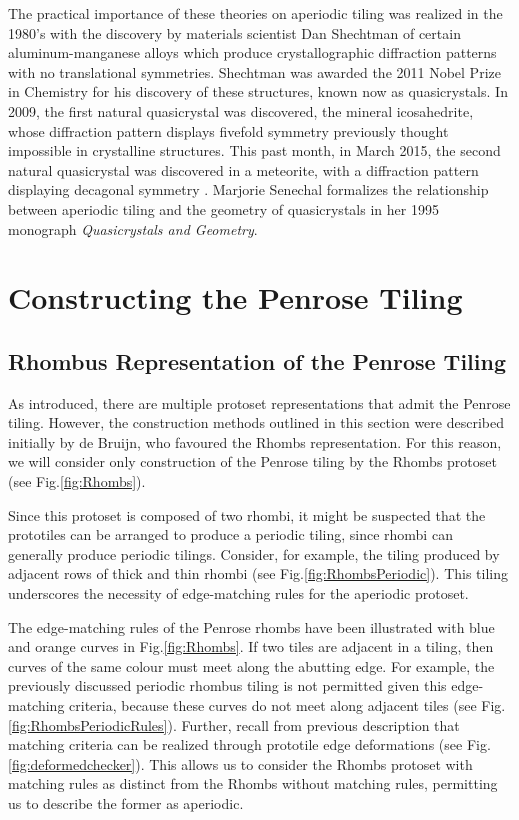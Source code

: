 \documentclass[
  oneside,
  11pt, a4paper,
  footinclude=true,
  headinclude=true,
  cleardoublepage=empty
]{scrbook}
\begin{document}
The practical importance of these theories on aperiodic tiling was realized in the 1980's with the discovery by materials scientist Dan Shechtman of certain aluminum-manganese alloys which produce crystallographic diffraction patterns with no translational symmetries. Shechtman was awarded the 2011 Nobel Prize in Chemistry for his discovery of these structures, known now as quasicrystals. In 2009, the first natural quasicrystal was discovered, the mineral icosahedrite, whose diffraction pattern displays fivefold symmetry previously thought impossible in crystalline structures. This past month, in March 2015, the second natural quasicrystal was discovered in a meteorite, with a diffraction pattern displaying decagonal symmetry \cite{Bindi2015}. Marjorie Senechal formalizes the relationship between aperiodic tiling and the geometry of quasicrystals in her 1995 monograph \textit{Quasicrystals and Geometry}. 


\chapter{Constructing the Penrose Tiling}

\section{Rhombus Representation of the Penrose Tiling} %
As introduced, there are multiple protoset representations that admit the Penrose tiling. However, the construction methods outlined in this section were described initially by de Bruijn, who favoured the Rhombs representation.  For this reason, we will consider only construction of the Penrose tiling by the Rhombs protoset (see Fig.\ref{fig:Rhombs}). 

Since this protoset is composed of two rhombi, it might be suspected that the prototiles can be arranged to produce a periodic tiling, since rhombi can generally produce periodic tilings. Consider, for example, the tiling produced by adjacent rows of thick and thin rhombi (see Fig.\ref{fig:RhombsPeriodic}). This tiling underscores the necessity of edge-matching rules for the aperiodic protoset. 

The edge-matching rules of the Penrose rhombs have been illustrated with blue and orange curves in Fig.\ref{fig:Rhombs}. If two tiles are adjacent in a tiling, then curves of the same colour must meet along the abutting edge. For example, the previously discussed periodic rhombus tiling is not permitted given this edge-matching criteria, because these curves do not meet along adjacent tiles (see Fig.\ref{fig:RhombsPeriodicRules}). Further, recall from previous description that matching criteria can be realized through prototile edge deformations (see Fig.\ref{fig:deformedchecker}). This allows us to consider the Rhombs protoset with matching rules as distinct from the Rhombs without matching rules, permitting us to describe the former as aperiodic. 
\end{document}
